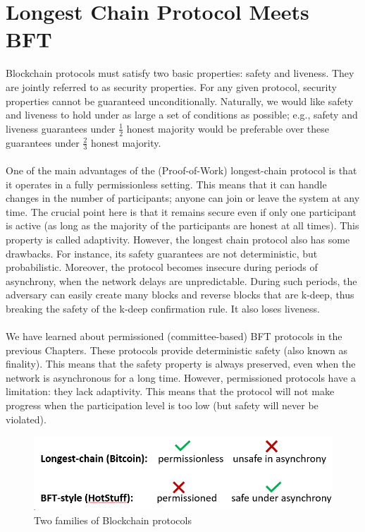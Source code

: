\chapter{Longest Chain Protocol Meets BFT}
Blockchain protocols must satisfy two basic properties: safety and liveness. They are jointly referred to as security properties.
For any given protocol, security properties cannot be guaranteed unconditionally. Naturally, we would like safety and liveness to hold under as large a set of conditions as possible; e.g., safety and liveness guarantees under $\frac{1}{2}$
honest majority would be preferable over these guarantees under $\frac{2}{3}$ honest majority.\\\\
One of the main advantages of the (Proof-of-Work) longest-chain protocol is that it operates in a fully permissionless setting. This means that it can handle changes in the number of participants; anyone can join or leave the system at any time. The crucial point here is that it remains secure even if only one participant is active (as long as the majority of the participants are honest at all times). This property is called adaptivity. However, the longest chain protocol also has some drawbacks. For instance, its safety guarantees are not deterministic, but probabilistic. Moreover, the protocol becomes insecure during periods of asynchrony, when the network delays are unpredictable. During such periods, the adversary can easily create many blocks and reverse blocks that are k-deep, thus breaking the safety of the k-deep confirmation rule. It also loses liveness.\\\\
We have learned about permissioned (committee-based) BFT protocols in the previous Chapters. These protocols provide deterministic safety (also known as finality). This means that the safety property is always preserved, even when the network is asynchronous for a long time. However, permissioned protocols have a limitation: they lack adaptivity. This means that the protocol will not make progress when the participation level is too low (but safety will never be violated).
\begin{figure}[h!]
	\centering
	\includegraphics[width=0.4\linewidth]{Fig/L17_F1}
	\caption{Two families of Blockchain protocols}
	\label{fig:L17_f1}
\end{figure}\\
